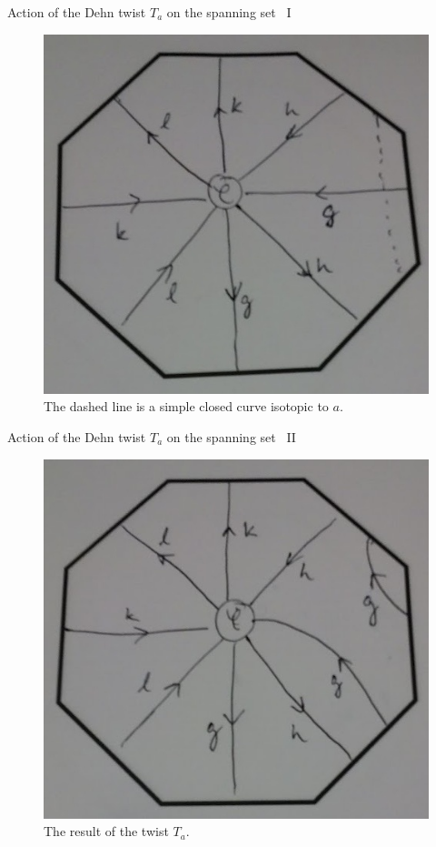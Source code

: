 \documentclass{beamer}
\begin{document}
\begin{frame}{Action of the Dehn twist $T_a$ on the spanning set \, I}
\begin{figure}[h]
\centering
\includegraphics[height=0.7\textheight]{1.jpeg}
\caption{The dashed line is a simple closed curve isotopic to $a$.}
\end{figure}
\end{frame}


\begin{frame}{Action of the Dehn twist $T_a$ on the spanning set \, II}
\begin{figure}[h]
\centering
\includegraphics[height=0.7\textheight]{2.jpeg}
\caption{The result of the twist $T_a$.}
\end{figure}
\end{frame}
\end{document}
